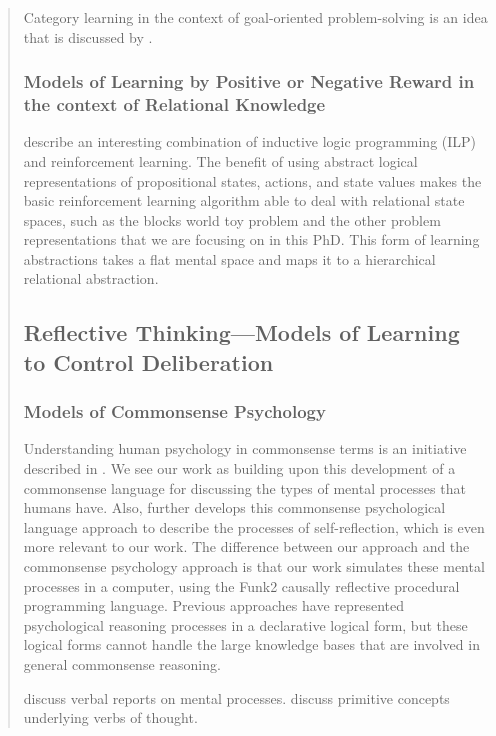 \begin{quotation}
Category learning in the context of goal-oriented problem-solving is an idea that is discussed by \cite{barsalou1995dcag}.

\subsubsection{Models of Learning by Positive or Negative Reward in the context of Relational Knowledge}

\cite{dvzeroski2001rrl} describe an interesting combination of inductive logic programming (ILP) \cite[]{muggleton1992ilp} and reinforcement learning.
The benefit of using abstract logical representations of propositional states, actions, and state values makes the basic reinforcement learning algorithm able to deal with relational state spaces, such as the blocks world toy problem and the other problem representations that we are focusing on in this PhD.
This form of learning abstractions takes a flat mental space and maps it to a hierarchical relational abstraction.

\subsection{Reflective Thinking---Models of Learning to Control Deliberation}

\subsubsection{Models of Commonsense Psychology}

Understanding human psychology in commonsense terms is an initiative described in \cite{gordon2004fcp}.
We see our work as building upon this development of a commonsense language for discussing the types of mental processes that humans have.
Also, \cite{gordon2008asm} further develops this commonsense psychological language approach to describe the processes of self-reflection, which is even more relevant to our work.
The difference between our approach and the commonsense psychology approach is that our work simulates these mental processes in a computer, using the Funk2 causally reflective procedural programming language.
Previous approaches have represented psychological reasoning processes in a declarative logical form, but these logical forms cannot handle the large knowledge bases that are involved in general commonsense reasoning.

\cite{wilson1977tmt} discuss verbal reports on mental processes.
\cite{schank1972pcu} discuss primitive concepts underlying verbs of thought.


\end{quotation}
